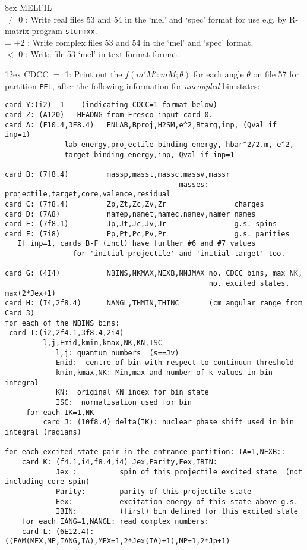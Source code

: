 \documentclass[11pt]{article}
\begin{document}
\hangindent 8ex  MELFIL
\\  $\ne$ 0 : Write real files 53 and 54 in the `mel' and `spec' format
        for use e.g. by R-matrix program {\tt sturmxx}.
\\  = $\pm$2 : Write complex files 53 and 54 in the `mel' and `spec' format.
\\   $<$ 0 : Write file 53 `mel' in text format format.

 \newpage
\hangindent 12ex  
CDCC   $=$ 1:
Print out the $f(m'M':mM; \theta)$ for each angle $\theta$
on file 57 for partition {\tt PEL}, after the following information for {\em uncoupled} bin states:
{\small
\begin{verbatim}
card Y:(i2)  1    (indicating CDCC=1 format below)
card Z: (A120)   HEADNG from Fresco input card 0.
card A: (F10.4,3F8.4)   ENLAB,Bproj,H2SM,e^2,Btarg,inp, (Qval if inp=1)
              lab energy,projectile binding energy, hbar^2/2.m, e^2, 
              target binding energy,inp, Qval if inp=1
                                                
card B: (7f8.4)         massp,masst,massc,massv,massr  
                                         masses: projectile,target,core,valence,residual
card C: (7f8.4)         Zp,Zt,Zc,Zv,Zr                charges
card D: (7A8)           namep,namet,namec,namev,namer names
card E: (7f8.1)         Jp,Jt,Jc,Jv,Jr                g.s. spins
card F: (7i8)           Pp,Pt,Pc,Pv,Pr                g.s. parities
   If inp=1, cards B-F (incl) have further #6 and #7 values 
                for 'initial projectile' and 'initial target' too.
   
card G: (4I4)           NBINS,NKMAX,NEXB,NNJMAX no. CDCC bins, max NK,
                                                no. excited states, max(2*Jex+1)
card H: (I4,2f8.4)      NANGL,THMIN,THINC       (cm angular range from Card 3)
for each of the NBINS bins:
 card I:(i2,2f4.1,3f8.4,2i4)
         l,j,Emid,kmin,kmax,NK,KN,ISC
            l,j: quantum numbers  (s==Jv)
            Emid:  centre of bin with respect to continuum threshold
            kmin,kmax,NK: Min,max and number of k values in bin integral
            KN:  original KN index for bin state
            ISC:  normalisation used for bin
     for each IK=1,NK
         card J: (10f8.4) delta(IK): nuclear phase shift used in bin integral (radians)

for each excited state pair in the entrance partition: IA=1,NEXB::
    card K: (f4.1,i4,f8.4,i4) Jex,Parity,Eex,IBIN:
            Jex :          spin of this projectile excited state  (not including core spin)
            Parity:        parity of this projectile state
            Eex:           excitation energy of this state above g.s.
            IBIN:          (first) bin defined for this excited state
    for each IANG=1,NANGL: read complex numbers:
    card L: (6E12.4): ((FAM(MEX,MP,IANG,IA),MEX=1,2*Jex(IA)+1),MP=1,2*Jp+1)
\end{verbatim}
}
\end{document}
